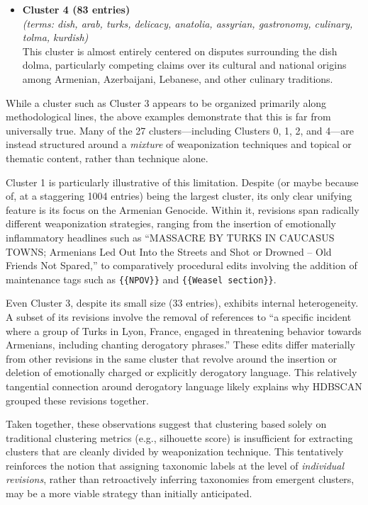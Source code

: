 \documentclass[11pt, a4paper, twoside, openright]{article} %
\begin{document}
\begin{itemize}
\item \textbf{Cluster 4 (83 entries)}\\
\textit{(terms: dish, arab, turks, delicacy, anatolia, assyrian, gastronomy, culinary, tolma, kurdish)}\\
This cluster is almost entirely centered on disputes surrounding the dish dolma, particularly competing claims over its cultural and national origins among Armenian, Azerbaijani, Lebanese, and other culinary traditions.
\end{itemize}

While a cluster such as Cluster 3 appears to be organized primarily along methodological lines, the above examples demonstrate that this is far from universally true. Many of the 27 clusters—including Clusters 0, 1, 2, and 4—are instead structured around a \emph{mixture} of weaponization techniques and topical or thematic content, rather than technique alone.

Cluster 1 is particularly illustrative of this limitation. Despite (or maybe because of, at a staggering 1004 entries) being the largest cluster, its only clear unifying feature is its focus on the Armenian Genocide. Within it, revisions span radically different weaponization strategies, ranging from the insertion of emotionally inflammatory headlines such as ``MASSACRE BY TURKS IN CAUCASUS TOWNS; Armenians Led Out Into the Streets and Shot or Drowned -- Old Friends Not Spared,'' to comparatively procedural edits involving the addition of maintenance tags such as \texttt{\{\{NPOV\}\}} and \texttt{\{\{Weasel section\}\}}.

Even Cluster 3, despite its small size (33 entries), exhibits internal heterogeneity. A subset of its revisions involve the removal of references to ``a specific incident where a group of Turks in Lyon, France, engaged in threatening behavior towards Armenians, including chanting derogatory phrases.'' These edits differ materially from other revisions in the same cluster that revolve around the insertion or deletion of emotionally charged or explicitly derogatory language. This relatively tangential connection around derogatory language likely explains why HDBSCAN grouped these revisions together.

Taken together, these observations suggest that clustering based solely on traditional clustering metrics (e.g., silhouette score) is insufficient for extracting clusters that are cleanly divided by weaponization technique. This tentatively reinforces the notion that assigning taxonomic labels at the level of \emph{individual revisions}, rather than retroactively inferring taxonomies from emergent clusters, may be a more viable strategy than initially anticipated.
\end{document}
